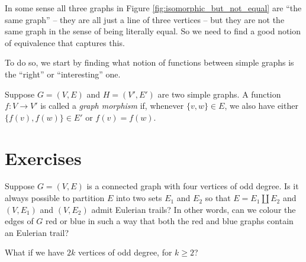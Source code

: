 \documentclass[nobib]{tufte-handout}
\begin{document}
In some sense all three graphs in Figure \ref{fig:isomorphic_but_not_equal} are ``the same graph'' -- they are all just a line of three vertices -- but they are not the same graph in the sense of being literally equal. So we need to find a good notion of equivalence that captures this.

To do so, we start by finding what notion of functions between simple graphs is the ``right'' or ``interesting'' one.

\begin{definition}
  Suppose $G = (V, E)$ and $H = (V', E')$ are two simple graphs. A function $f: V \to V'$ is called a \emph{graph morphism} if, whenever $\{v, w\} \in E$, we also have either $\{f(v), f(w)\} \in E'$ or $f(v) = f(w)$. 
\end{definition}

\section{Exercises}

\begin{xca}
  Suppose $G = (V, E)$ is a connected graph with four vertices of odd degree. Is it always possible to partition $E$ into two sets $E_1$ and $E_2$ so that $E = E_1 \coprod E_2$ and $(V, E_1)$ and $(V,E_2)$ admit Eulerian trails? In other words, can we colour the edges of $G$ red or blue in such a way that both the red and blue graphs contain an Eulerian trail?

  What if we have $2k$ vertices of odd degree, for $k \geq 2$?
\end{xca}

%
%
\end{document}

